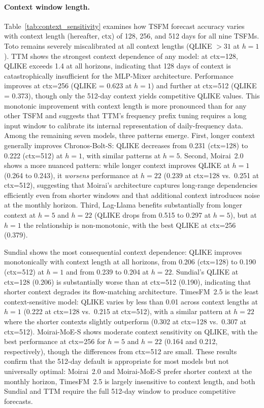 \documentclass[12pt]{article}
\begin{document}
\paragraph{Context window length.}
Table~\ref{tab:context_sensitivity} examines how TSFM forecast accuracy varies with context length (hereafter, ctx) of 128, 256, and 512 days for all nine TSFMs. Toto remains severely miscalibrated at all context lengths (QLIKE $> 31$ at $h = 1$). TTM shows the strongest context dependence of any model: at ctx=128, QLIKE exceeds 1.4 at all horizons, indicating that 128 days of context is catastrophically insufficient for the MLP-Mixer architecture. Performance improves at ctx=256 (QLIKE = 0.623 at $h = 1$) and further at ctx=512 (QLIKE = 0.373), though only the 512-day context yields competitive QLIKE values. This monotonic improvement with context length is more pronounced than for any other TSFM and suggests that TTM's frequency prefix tuning requires a long input window to calibrate its internal representation of daily-frequency data. Among the remaining seven models, three patterns emerge. First, longer context generally improves Chronos-Bolt-S: QLIKE decreases from 0.231 (ctx=128) to 0.222 (ctx=512) at $h = 1$, with similar patterns at $h = 5$. Second, Moirai~2.0 shows a more nuanced pattern: while longer context improves QLIKE at $h = 1$ (0.264 to 0.243), it \emph{worsens} performance at $h = 22$ (0.239 at ctx=128 vs.\ 0.251 at ctx=512), suggesting that Moirai's architecture captures long-range dependencies efficiently even from shorter windows and that additional context introduces noise at the monthly horizon. Third, Lag-Llama benefits substantially from longer context at $h = 5$ and $h = 22$ (QLIKE drops from 0.515 to 0.297 at $h = 5$), but at $h = 1$ the relationship is non-monotonic, with the best QLIKE at ctx=256 (0.379).

Sundial shows the most consequential context dependence: QLIKE improves monotonically with context length at all horizons, from 0.206 (ctx=128) to 0.190 (ctx=512) at $h = 1$ and from 0.239 to 0.204 at $h = 22$. Sundial's QLIKE at ctx=128 (0.206) is substantially worse than at ctx=512 (0.190), indicating that shorter context degrades its flow-matching architecture. TimesFM~2.5 is the least context-sensitive model: QLIKE varies by less than 0.01 across context lengths at $h = 1$ (0.222 at ctx=128 vs.\ 0.215 at ctx=512), with a similar pattern at $h = 22$ where the shorter contexts slightly outperform (0.302 at ctx=128 vs.\ 0.307 at ctx=512). Moirai-MoE-S shows moderate context sensitivity on QLIKE, with the best performance at ctx=256 for $h = 5$ and $h = 22$ (0.164 and 0.212, respectively), though the differences from ctx=512 are small. These results confirm that the 512-day default is appropriate for most models but not universally optimal: Moirai~2.0 and Moirai-MoE-S prefer shorter context at the monthly horizon, TimesFM~2.5 is largely insensitive to context length, and both Sundial and TTM require the full 512-day window to produce competitive forecasts.
\end{document}
